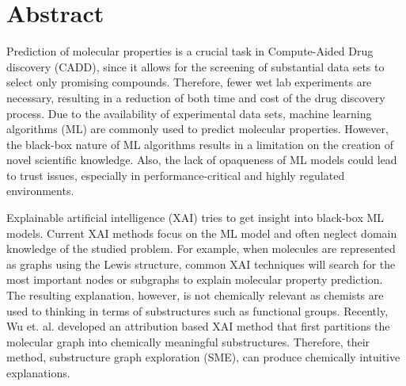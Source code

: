 \chapter{Abstract}


Prediction of molecular properties is a crucial task in Compute-Aided 
Drug discovery (CADD), since it allows for the screening of substantial 
data sets to select only promising compounds. Therefore, fewer wet lab experiments are necessary, 
resulting in a reduction of both time and cost of the drug discovery process.\cite{adelusi2022molecular} 
Due to the availability of experimental data sets, machine learning 
algorithms (ML) are commonly used to predict molecular properties.\cite{wu2018moleculenet, gorgulla2022emerging, tropsha2024integrating} 
However, the black-box nature of ML algorithms 
results in a limitation on the creation of novel scientific knowledge. Also, 
the lack of opaqueness of ML models could lead to trust issues, especially 
in performance-critical and highly regulated environments.\cite{carvalho2019machine}


% 


Explainable artificial intelligence (XAI) tries to get insight into black-box 
ML models.\cite{carvalho2019machine, yuan2022explainability} 
Current XAI methods focus on the ML model and often neglect domain 
knowledge of the studied problem. For example, when molecules are represented 
as graphs using the Lewis structure\cite{ahmad1992drawing}, common XAI techniques will search for the 
most important nodes or subgraphs to explain molecular property prediction.\cite{wu2023chemistry} The 
resulting explanation, however, is not chemically relevant as chemists are used 
to thinking in terms of substructures such as functional groups. Recently, Wu et. 
al. developed an attribution based XAI method that first partitions the molecular graph into 
chemically meaningful substructures. Therefore, their method, substructure graph 
exploration (SME), can produce chemically intuitive explanations.\cite{wu2023chemistry}


